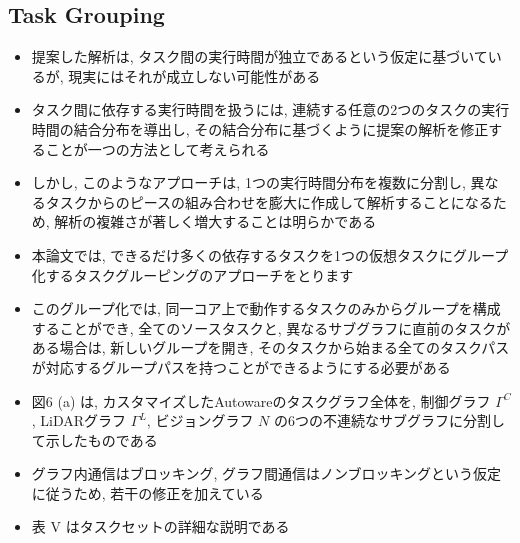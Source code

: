 \subsection{Task Grouping}
\label{ssec: task grouping}

\begin{frame}{}
    \begin{itemize}
        \item 提案した解析は, タスク間の実行時間が独立であるという仮定に基づいているが, 現実にはそれが成立しない可能性がある
\item タスク間に依存する実行時間を扱うには, 連続する任意の2つのタスクの実行時間の結合分布を導出し, その結合分布に基づくように提案の解析を修正することが一つの方法として考えられる
\item しかし, このようなアプローチは, 1つの実行時間分布を複数に分割し, 異なるタスクからのピースの組み合わせを膨大に作成して解析することになるため, 解析の複雑さが著しく増大することは明らかである
    \end{itemize}
\end{frame}

\begin{frame}{}
    \begin{itemize}
        \item 本論文では, できるだけ多くの依存するタスクを1つの仮想タスクにグループ化するタスクグルーピングのアプローチをとります
\item このグループ化では, 同一コア上で動作するタスクのみからグループを構成することができ, 全てのソースタスクと, 異なるサブグラフに直前のタスクがある場合は, 新しいグループを開き, そのタスクから始まる全てのタスクパスが対応するグループパスを持つことができるようにする必要がある
    \end{itemize}
\end{frame}

\begin{frame}{}
    \begin{itemize}
        \item 図6 (a) は, カスタマイズしたAutowareのタスクグラフ全体を, 制御グラフ $\Gamma^{C}$, LiDARグラフ $\Gamma^{L}$, ビジョングラフ $N$ の6つの不連続なサブグラフに分割して示したものである
\item グラフ内通信はブロッキング, グラフ間通信はノンブロッキングという仮定に従うため, 若干の修正を加えている
\item 表 $\mathrm{V}$ はタスクセットの詳細な説明である
    \end{itemize}
\end{frame}

